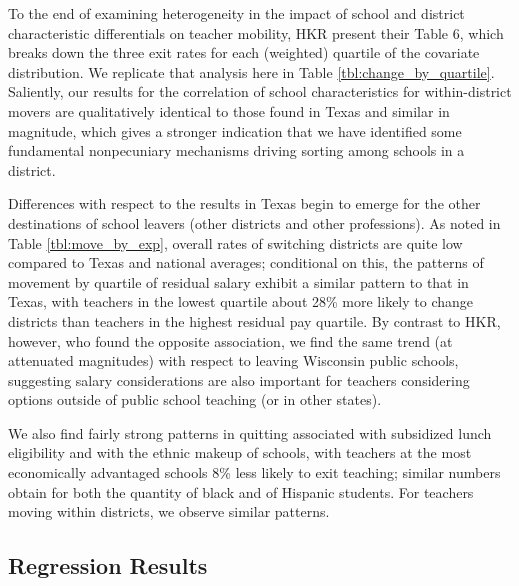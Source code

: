 \documentclass[12pt,]{article}
\begin{document}
To the end of examining heterogeneity in the impact of school and
district characteristic differentials on teacher mobility, HKR present
their Table 6, which breaks down the three exit rates for each
(weighted) quartile of the covariate distribution. We replicate that
analysis here in Table \ref{tbl:change_by_quartile}. Saliently, our
results for the correlation of school characteristics for
within-district movers are qualitatively identical to those found in
Texas and similar in magnitude, which gives a stronger indication that
we have identified some fundamental nonpecuniary mechanisms driving
sorting among schools in a district.

Differences with respect to the results in Texas begin to emerge for the
other destinations of school leavers (other districts and other
professions). As noted in Table \ref{tbl:move_by_exp}, overall rates of
switching districts are quite low compared to Texas and national
averages; conditional on this, the patterns of movement by quartile of
residual salary exhibit a similar pattern to that in Texas, with
teachers in the lowest quartile about 28\% more likely to change
districts than teachers in the highest residual pay quartile. By
contrast to HKR, however, who found the opposite association, we find
the same trend (at attenuated magnitudes) with respect to leaving
Wisconsin public schools, suggesting salary considerations are also
important for teachers considering options outside of public school
teaching (or in other states).

We also find fairly strong patterns in quitting associated with
subsidized lunch eligibility and with the ethnic makeup of schools, with
teachers at the most economically advantaged schools 8\% less likely to
exit teaching; similar numbers obtain for both the quantity of black and
of Hispanic students. For teachers moving within districts, we observe
similar patterns.

\subsection{Regression Results}\label{regression-results}
\end{document}
